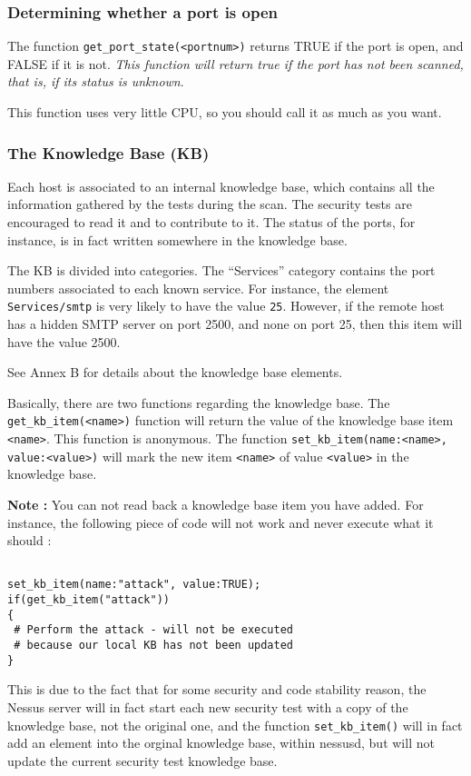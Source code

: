 \documentclass{article}
\begin{document}
\subsubsection{Determining whether a port is open}
The function \verb+get_port_state(<portnum>)+ returns
TRUE if the port is open, and FALSE if it is not.
\textit{This function will return true if the port has not been
scanned, that is, if its status is unknown}.

This function uses very little CPU, so you should call it as
much as you want.

\subsubsection{The Knowledge Base (KB)}
Each host is associated to an internal knowledge base, which contains
all the information gathered by the tests during the scan. The security
tests are encouraged to read it and to contribute to it. The status
of the ports, for instance, is in fact written somewhere in the
knowledge base.

The KB is divided into categories. The ``Services'' category contains
the port numbers associated to each known service. For instance, the element
\verb+Services/smtp+ is very likely to have the value \verb+25+. However,
if the remote host has a hidden SMTP server on port 2500, and none
on port 25, then this item will have the value 2500.

See Annex B for details about the knowledge base elements.

Basically, there are two functions regarding the knowledge base. The
\verb+get_kb_item(<name>)+ function will return the value of the knowledge
base item \verb+<name>+. This function is anonymous. The function
\verb+set_kb_item(name:<name>, value:<value>)+ will mark the new item 
\verb+<name>+ of value \verb+<value>+ in the knowledge base.

\textbf{Note : } You can not read back a knowledge base item you have added.
For instance, the following piece of code will not work and never execute
what it should :

\begin{verbatim}

set_kb_item(name:"attack", value:TRUE);
if(get_kb_item("attack"))
{
 # Perform the attack - will not be executed
 # because our local KB has not been updated
}
\end{verbatim}

This is due to the fact that for some security and code stability reason, 
the Nessus server will in fact start each new security test with a copy
of the knowledge base, not the original one, and the function
\verb+set_kb_item()+ will in fact add an element into the orginal knowledge
base, within nessusd, but will not update the current security test knowledge
base.
\end{document}
